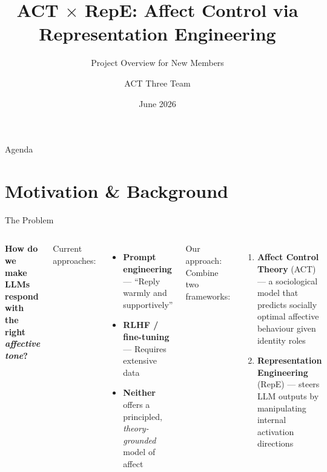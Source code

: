 \documentclass[aspectratio=169,11pt]{beamer}
\title{ACT $\times$ RepE: Affect Control via\\Representation Engineering}
\subtitle{Project Overview for New Members}
\date{June 2026}
\author{ACT Three Team}
\institute{AAAI 2027 --- Targeting Full Paper}
\begin{document}
\maketitle

\begin{frame}{Agenda}
\tableofcontents
\end{frame}

\section{Motivation \& Background}

\begin{frame}{The Problem}
\begin{columns}[T]
\textbf{How do we make LLMs respond with the right \emph{affective tone}?}

\bigskip

Current approaches:
\begin{itemize}
    \item \textbf{Prompt engineering} --- ``Reply warmly and supportively''
    \item \textbf{RLHF / fine-tuning} --- Requires extensive data
    \item \textbf{Neither} offers a principled, \emph{theory-grounded} model
          of affect
\end{itemize}

\alert{Our approach:} Combine two frameworks:
\begin{enumerate}
    \item \textbf{Affect Control Theory} (ACT) ---
          a sociological model that predicts socially optimal affective
          behaviour given identity roles
    \item \textbf{Representation Engineering} (RepE) ---
          steers LLM outputs by manipulating internal activation directions
\end{enumerate}
\end{columns}
\end{frame}
\end{document}
